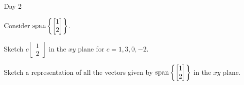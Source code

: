 \begin{applicationActivities}{Day 2}
\begin{activity}{10}
  Consider \(\operatorname{span}\left\{\begin{bmatrix}1\\2\end{bmatrix}\right\}\).
  \begin{subactivity}
    Sketch
    \(c\begin{bmatrix}1\\2\end{bmatrix}\) in the \(xy\) plane
    for \(c=1,3,0,-2\).
  \end{subactivity}
  \begin{subactivity}
    Sketch a representation of all the vectors given by
    \(\operatorname{span}\left\{\begin{bmatrix}1\\2\end{bmatrix}\right\}\)
    in the \(xy\) plane.
  \end{subactivity}
\end{activity}


\end{applicationActivities}
